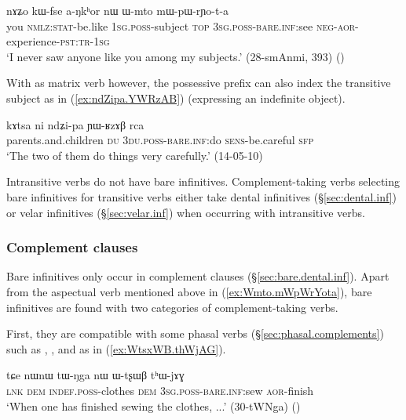 \begin{exe} 
\ex \label{ex:Wmto.mWpWrYota}
\gll nɤʑo kɯ-fse a-ŋkʰor nɯ ɯ-mto mɯ-pɯ-rɲo-t-a \\
you \textsc{nmlz}:\textsc{stat}-be.like \textsc{1sg}.\textsc{poss}-subject \textsc{top} \textsc{3sg}.\textsc{poss}-\textsc{bare}.\textsc{inf}:see \textsc{neg}-\textsc{aor}-experience-\textsc{pst}:\textsc{tr}-\textsc{1sg} \\
\glt `I never saw anyone like you among my subjects.' (28-smAnmi,  393) ()
\end{exe} 

With  as matrix verb however, the possessive prefix can also index the transitive subject as in (\ref{ex:ndZipa.YWRzAB}) (expressing an indefinite object).

\begin{exe}
\ex \label{ex:ndZipa.YWRzAB}
\gll kɤtsa ni ndʑi-pa ɲɯ-ʁzɤβ rca \\
parents.and.children \textsc{du} \textsc{3du}.\textsc{poss}-\textsc{bare}.\textsc{inf}:do \textsc{sens}-be.careful \textsc{sfp} \\
\glt `The two of them do things very carefully.' (14-05-10)
\end{exe}

Intransitive verbs do not have bare infinitives. Complement-taking verbs selecting bare infinitives for transitive verbs either take dental  infinitives (§\ref{sec:dental.inf}) or velar infinitives (§\ref{sec:velar.inf}) when occurring with intransitive verbs.

\subsubsection{Complement clauses} \label{sec:bare.inf.complement} 
Bare infinitives only occur in complement clauses (§\ref{sec:bare.dental.inf}). Apart from the aspectual verb  mentioned above in (\ref{ex:Wmto.mWpWrYota}), bare infinitives are found with two categories of complement-taking verbs.

First, they are compatible with some phasal verbs (§\ref{sec:phasal.complements}) such as , ,  and  as in (\ref{ex:WtsxWB.thWjAG}).

\begin{exe} 
\ex \label{ex:WtsxWB.thWjAG}
\gll  tɕe nɯnɯ tɯ-ŋga nɯ ɯ-tʂɯβ tʰɯ-jɤɣ \\
\textsc{lnk} \textsc{dem} \textsc{indef}.\textsc{poss}-clothes \textsc{dem} \textsc{3sg}.\textsc{poss}-\textsc{bare}.\textsc{inf}:sew \textsc{aor}-finish   \\
\glt `When one has finished sewing the clothes, ...' (30-tWNga)
()
\end{exe} 

